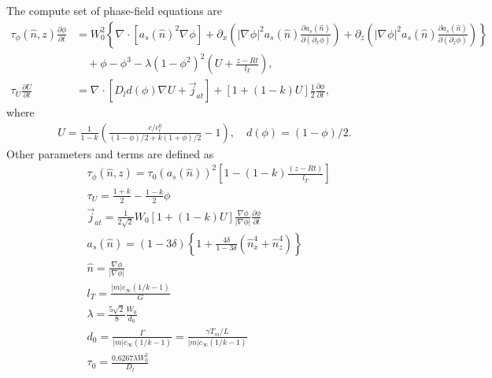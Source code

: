 \documentclass[a4paper,12pt]{article}
\renewcommand{\div}[1]{\nabla_{#1} \cdot}
\newcommand{\grad}[1]{\nabla_{#1}}
\begin{document}
The compute set of phase-field equations are 
\begin{align}
\tau_{\phi} (\hat{n},z) \frac{\partial \phi}{\partial t} &= W^2_0 \left\{ \div{} [a_s(\hat{n})^2 \grad{} \phi] +  \partial_x \left( |\grad{} \phi|^2 a_s(\hat{n}) \frac{\partial a_s(\hat{n})}{\partial (\partial_x \phi)}  \right)  +
\partial_z \left( |\grad{} \phi|^2 a_s(\hat{n}) \frac{\partial a_s(\hat{n})}{\partial (\partial_z \phi)}  \right)  \right \}  \nonumber \\
& \quad + \phi - \phi^3 - \lambda (1-\phi^2)^2 \left(U + \frac{z-R t}{ l_T} \right),  \label{eq:micro_phi}\\
\tau_U \frac{\partial U}{\partial t} &= \div{} [D_l d(\phi) \grad{} U + \vec{j}_{at}] + [1+(1-k)U]\frac{1}{2}  \frac{\partial \phi}{\partial t}, \label{eq:micro_U}
\end{align}
where 
\begin{align}
U = \frac{1}{1-k} \left( \frac{ c/c_l^0}{(1-\phi)/2 + k(1+\phi)/2} -1\right), \quad d(\phi) = (1-\phi)/2 .
\end{align}
Other parameters and terms are defined as
\begin{align}
    & \tau_{\phi}(\hat{n},z) = \tau_0(a_s(\hat{n}))^2 \left[1-(1-k) \frac{(z-Rt)}{ l_T} \right] \\
	& \tau_U = \frac{1+k}{2} - \frac{1-k}{2}\phi \\
	& \vec{j}_{at} =  \frac{1}{2\sqrt{2}} W_0 [1+(1-k)U] \frac{\nabla \phi}{|\nabla \phi|} \frac{\partial \phi}{\partial t} \\
	& a_{s}(\hat{n}) = (1-3\delta)\left\{1+\frac{4 \delta}{1-3\delta}(\hat{n}_x^4 + \hat{n}_z^4) \right\} \\
    & \hat{n} =  \frac{\nabla \phi}{|\nabla \phi|} \\
    & l_T = \frac{|m|c_{\infty}(1/k-1)}{G} \\
    & \lambda =  \frac{5\sqrt{2}}{8}  \frac{W_0}{d_0} \\
    & d_0 = \frac{\Gamma}{|m|c_{\infty}(1/k-1)} =   \frac{\gamma T_m/L}{|m|c_{\infty}(1/k-1)}  \\
    & \tau_0 =  \frac{0.6267\lambda W_0^2}{D_l}
\end{align}
\end{document}
